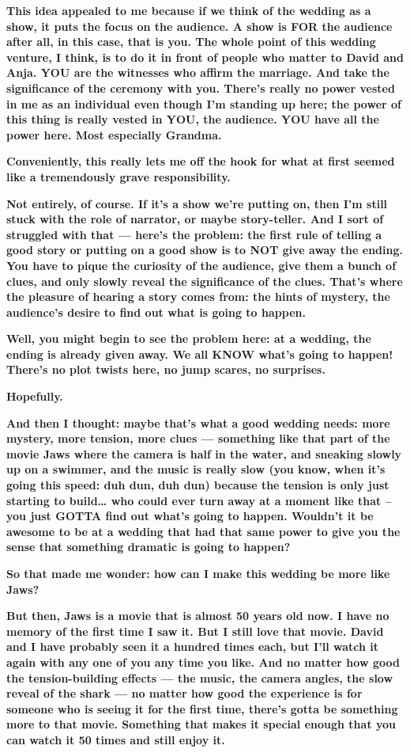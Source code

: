 \textbf{This idea appealed to me because if we think of the wedding as a
show, it puts the focus on the audience. A show is FOR the audience
after all, in this case, that is you. The whole point of this wedding
venture, I think, is to do it in front of people who matter to David and
Anja. YOU are the witnesses who affirm the marriage. And take the
significance of the ceremony with you. There's really no power vested in
me as an individual even though I'm standing up here; the power of this
thing is really vested in YOU, the audience. YOU have all the power
here. Most especially Grandma.}

\textbf{Conveniently, this really lets me off the hook for what at first
seemed like a tremendously grave responsibility.}

\textbf{Not entirely, of course. If it's a show we're putting on, then
I'm still stuck with the role of narrator, or maybe story-teller. And I
sort of struggled with that --- here's the problem: the first rule of
telling a good story or putting on a good show is to NOT give away the
ending. You have to pique the curiosity of the audience, give them a
bunch of clues, and only slowly reveal the significance of the clues.
That's where the pleasure of hearing a story comes from: the hints of
mystery, the audience's desire to find out what is going to happen.}

\textbf{Well, you might begin to see the problem here: at a wedding, the
ending is already given away. We all KNOW what's going to happen!
There's no plot twists here, no jump scares, no surprises.}

\textbf{Hopefully.}

\textbf{And then I thought: maybe that's what a good wedding needs: more
mystery, more tension, more clues --- something like that part of the
movie Jaws where the camera is half in the water, and sneaking slowly up
on a swimmer, and the music is really slow (you know, when it's going
this speed: duh dun, duh dun) because the tension is only just starting
to build\ldots{} who could ever turn away at a moment like that -- you
just GOTTA find out what's going to happen. Wouldn't it be awesome to be
at a wedding that had that same power to give you the sense that
something dramatic is going to happen?}

\textbf{So that made me wonder: how can I make this wedding be more like
Jaws?}

\textbf{But then, Jaws is a movie that is almost 50 years old now. I
have no memory of the first time I saw it. But I still love that movie.
David and I have probably seen it a hundred times each, but I'll watch
it again with any one of you any time you like. And no matter how good
the tension-building effects --- the music, the camera angles, the slow
reveal of the shark --- no matter how good the experience is for someone
who is seeing it for the first time, there's gotta be something more to
that movie. Something that makes it special enough that you can watch it
50 times and still enjoy it.}

